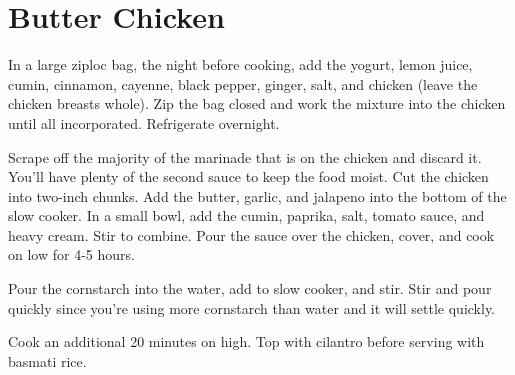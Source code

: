 \section{Butter Chicken}
\begin{recipe}



In a large ziploc bag, the night before cooking, add the yogurt, lemon juice, cumin, cinnamon, cayenne, black pepper, ginger, salt, and chicken (leave the chicken breasts whole). Zip the bag closed and work the mixture into the chicken until all incorporated. Refrigerate overnight.

Scrape off the majority of the marinade that is on the chicken and discard it. You'll have plenty of the second sauce to keep the food moist. Cut the chicken into two-inch chunks. Add the butter, garlic, and jalapeno into the bottom of the slow cooker. In a small bowl, add the cumin, paprika, salt, tomato sauce, and heavy cream. Stir to combine. Pour the sauce over the chicken, cover, and cook on low for 4-5 hours.

Pour the cornstarch into the water, add to slow cooker, and stir. Stir and pour quickly since you're using more cornstarch than water and it will settle quickly.

Cook an additional 20 minutes on high. Top with cilantro before serving with basmati rice.

\end{recipe}
